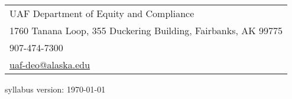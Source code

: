 \documentclass[12pt]{article}
\def\mailto#1{\href{mailto:#1}{#1}}
\begin{document}
\begin{tabular}{l}
UAF Department of Equity and Compliance\\
1760 Tanana Loop, 355 Duckering Building, Fairbanks, AK  99775\\
907-474-7300\\
\mailto{uaf-deo@alaska.edu}
\end{tabular}

\hfill

 \scriptsize syllabus version: \today \normalsize
\end{document}
